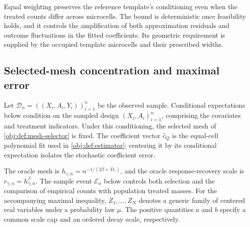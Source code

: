 Equal weighting preserves the reference template's conditioning even when the treated counts differ across microcells. The bound is deterministic once feasibility holds, and it controls the amplification of both approximation residuals and outcome fluctuations in the fitted coefficients. Its geometric requirement is supplied by the occupied template microcells and their prescribed widths.

\subsection{Selected-mesh concentration and maximal error}

Let \(\mathcal D_n=((X_i,A_i,Y_i))_{i=1}^n\) be the observed sample. Conditional expectations below condition on the sampled design \((X_i,A_i)_{i=1}^n\), comprising the covariates and treatment indicators. Under this conditioning, the selected mesh of \cref{obj:def:mesh-selector} is fixed. The coefficient vector \(\widehat c_Q\) is the equal-cell polynomial fit used in \cref{obj:def:estimator}; centering it by its conditional expectation isolates the stochastic coefficient error.

The oracle mesh is \(h_{\gamma,n}=n^{-1/(2\beta+D_\gamma)}\), and the oracle response-recovery scale is \(r_{\gamma,n}=h_{\gamma,n}^{\beta}\). The sample event \(\mathcal E_n\) below controls both selection and the comparison of empirical counts with population treated masses. For the accompanying maximal inequality, \(Z_1,\ldots,Z_N\) denotes a generic family of centered real variables under a probability law \(\mu\). The positive quantities \(a\) and \(b\) specify a common scale cap and an ordered decay scale, respectively.

